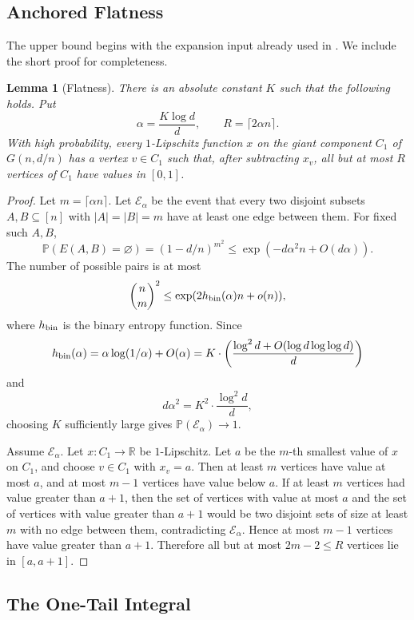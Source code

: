 \documentclass[11pt]{article}
\newtheorem{lemma}[theorem]{Lemma}
\theoremstyle{definition}
\newcommand{\RR}{\mathbb{R}}
\newcommand{\PP}{\mathbb{P}}
\newcommand{\calE}{\mathcal{E}}
\newcommand{\hbin}{h_{\rm bin}}
\begin{document}
\subsection{Anchored Flatness}

The upper bound begins with the expansion input already used in \cite{KorskySaffatAiylam}.  We include the short proof for completeness.

\begin{lemma}[Flatness]\label{lem:flatness}
There is an absolute constant $K$ such that the following holds.  Put
\[
  \alpha=\frac{K\log d}{d},\qquad R=\lceil 2\alpha n\rceil.
\]
With high probability, every $1$-Lipschitz function $x$ on the giant component $C_1$ of $G(n,d/n)$ has a vertex $v\in C_1$ such that, after subtracting $x_v$, all but at most $R$ vertices of $C_1$ have values in $[0,1]$.
\end{lemma}


\begin{proof}
Let \(m=\lceil\alpha n\rceil\).  Let \(\calE_\alpha\) be the event that every two disjoint subsets \(A,B\subseteq[n]\) with \(|A|=|B|=m\) have at least one edge between them.  For fixed such \(A,B\),
\[
  \PP(E(A,B)=\varnothing)=(1-d/n)^{m^2}
  \le \exp(-d\alpha^2 n+O(d\alpha)).
\]
The number of possible pairs is at most
\[
  \binom{n}{m}^2\le \exp(2\hbin(\alpha)n+o(n)),
\]
where \(\hbin\) is the binary entropy function.  Since
\[
  \hbin(\alpha)=\alpha\log(1/\alpha)+O(\alpha)
  =K\cdot\left(\frac{\log^2 d+O(\log d\log\log d)}{d}\right)
\]
and
\[
  d\alpha^2=K^2\cdot\frac{\log^2 d}{d},
\]
choosing \(K\) sufficiently large gives \(\PP(\calE_\alpha)\to1\).

\bigskip
\noindent
Assume \(\calE_\alpha\).  Let \(x:C_1\to\RR\) be \(1\)-Lipschitz.  Let \(a\) be the \(m\)-th smallest value of \(x\) on \(C_1\), and choose \(v\in C_1\) with \(x_v=a\).  Then at least \(m\) vertices have value at most \(a\), and at most \(m-1\) vertices have value below \(a\).  If at least \(m\) vertices had value greater than \(a+1\), then the set of vertices with value at most \(a\) and the set of vertices with value greater than \(a+1\) would be two disjoint sets of size at least \(m\) with no edge between them, contradicting \(\calE_\alpha\).  Hence at most \(m-1\) vertices have value greater than \(a+1\).  Therefore all but at most \(2m-2\le R\) vertices lie in \([a,a+1]\).
\end{proof}

\subsection{The One-Tail Integral}
\end{document}
